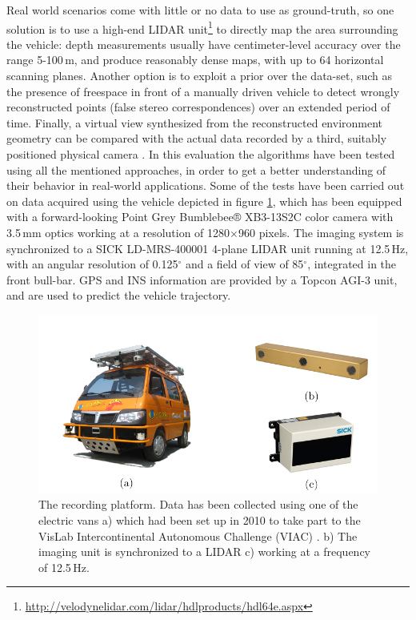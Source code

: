 Real world scenarios come with little or no data to use as ground-truth, so one solution \cite{Morales2011, Geiger2012} is to use a high-end \ac{LIDAR} unit\footnote{\url{http://velodynelidar.com/lidar/hdlproducts/hdl64e.aspx}} to directly map the area surrounding the vehicle: depth measurements usually have centimeter-level accuracy over the range 5-100\,m, and produce reasonably dense maps, with up to 64 horizontal scanning planes. Another option is to exploit a prior over the data-set, such as the presence of freespace in front of a manually driven vehicle \cite{Steingrube2009} to detect wrongly reconstructed points (false stereo correspondences) over an extended period of time. Finally, a virtual view synthesized from the reconstructed environment geometry can be compared with the actual data recorded by a third, suitably positioned physical camera \cite{Morales2011, Morales2009}.
In this evaluation the algorithms have been tested using all the mentioned approaches, in order to get a better understanding of their behavior in real-world applications. Some of the tests have been carried out on data acquired using the vehicle depicted in figure \ref{fig:cp03_VIAC}, which has been equipped with a forward-looking Point Grey Bumblebee® XB3-13S2C color camera with 3.5\,mm optics working at a resolution of 1280$\times$960 pixels. The imaging system is synchronized to a SICK LD-MRS-400001 4-plane LIDAR unit running at 12.5\,Hz, with an angular resolution of 0.125$^\circ$ and a field of view of 85$^\circ$, integrated in the front bull-bar. GPS and INS information are provided by a Topcon AGI-3 unit, and are used to predict the vehicle trajectory.

\begin{figure}[thpb]
      \centering
      \includegraphics[width=\textwidth, trim=0 0 0 40,clip]{viac}
      \caption{ The recording platform. Data has been collected using one of the electric vans a) which had been set up in 2010 to take part to the VisLab Intercontinental Autonomous Challenge (VIAC) \cite{Broggi2010VIAC}. b) The imaging unit  is synchronized to a LIDAR c) working at a frequency of 12.5\,Hz. }      
      \label{fig:cp03_VIAC}
\end{figure}

